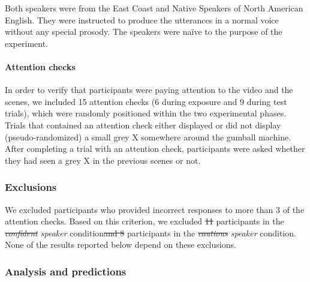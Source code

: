 \documentclass[man, floatsintext]{apa6}
\providecommand{\DIFadd}[1]{{\protect\color{blue}\uwave{#1}}} %
\providecommand{\DIFdel}[1]{{\protect\color{red}\sout{#1}}}                      %
\providecommand{\DIFaddbegin}{} %
\providecommand{\DIFaddend}{} %
\providecommand{\DIFdelbegin}{} %
\providecommand{\DIFdelend}{} %
\newcommand{\DIFscaledelfig}{0.5}
\newlength{\DIFdelgraphicswidth} %
\newlength{\DIFdelgraphicsheight} %
\newcommand{\DIFaddincludegraphics}[2][]{{\color{blue}\fbox{\DIFOincludegraphics[#1]{#2}}}} %
\newcommand{\DIFdelincludegraphics}[2][]{%
\sbox{\DIFdelgraphicsbox}{\DIFOincludegraphics[#1]{#2}}%
\settoboxwidth{\DIFdelgraphicswidth}{\DIFdelgraphicsbox} %
\settoboxtotalheight{\DIFdelgraphicsheight}{\DIFdelgraphicsbox} %
\scalebox{\DIFscaledelfig}{%
\parbox[b]{\DIFdelgraphicswidth}{\usebox{\DIFdelgraphicsbox}\\[-\baselineskip] \rule{\DIFdelgraphicswidth}{0em}}\llap{\resizebox{\DIFdelgraphicswidth}{\DIFdelgraphicsheight}{%
\setlength{\unitlength}{\DIFdelgraphicswidth}%
\begin{picture}(1,1)%
\thicklines\linethickness{2pt} %
{\color[rgb]{1,0,0}\put(0,0){\framebox(1,1){}}}%
{\color[rgb]{1,0,0}\put(0,0){\line( 1,1){1}}}%
{\color[rgb]{1,0,0}\put(0,1){\line(1,-1){1}}}%
\end{picture}%
}\hspace*{3pt}}} %
} %
\DeclareRobustCommand{\DIFaddbegin}{\DIFOaddbegin \let\includegraphics\DIFaddincludegraphics} %
\DeclareRobustCommand{\DIFaddend}{\DIFOaddend \let\includegraphics\DIFOincludegraphics} %
\DeclareRobustCommand{\DIFdelbegin}{\DIFOdelbegin \let\includegraphics\DIFdelincludegraphics} %
\DeclareRobustCommand{\DIFdelend}{\DIFOaddend \let\includegraphics\DIFOincludegraphics} %
\begin{document}
Both speakers were from the East Coast and Native Speakers of North American English.
They were instructed to produce the utterances in a normal voice without any special prosody. The speakers were
na\"ive to the purpose of the experiment.


\paragraph{Attention checks\DIFaddbegin \DIFadd{:}\DIFaddend }  In order to verify that participants were paying attention to the video and the scenes, we included 15 attention checks (6 during exposure and 9 during test trials), which were randomly positioned within the two experimental phases. Trials that contained an attention check either displayed or did not display (pseudo-randomized) a small grey X somewhere around the gumball machine. After completing a trial with an attention check, participants were asked whether they had seen a grey X in the previous scenes or not.

\subsubsection{Exclusions} We excluded participants who provided incorrect responses to more than 3 of the attention checks. Based on this criterion, we excluded \DIFdelbegin \DIFdel{11 }\DIFdelend \DIFaddbegin \DIFadd{8 }\DIFaddend participants in the \textit{\DIFdelbegin \DIFdel{confident }\DIFdelend \DIFaddbegin \DIFadd{cautious }\DIFaddend speaker} condition\DIFdelbegin \DIFdel{and 8 }\DIFdelend \DIFaddbegin \DIFadd{, and 7 }\DIFaddend participants in the \textit{\DIFdelbegin \DIFdel{cautious }\DIFdelend \DIFaddbegin \DIFadd{confident }\DIFaddend speaker} condition. None of the results reported below depend on these exclusions.


\subsubsection{Analysis and predictions}  
\end{document}
